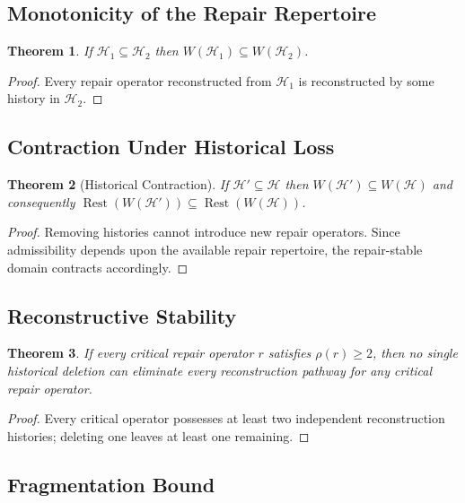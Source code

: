 \documentclass[12pt,oneside]{article}
\theoremstyle{plain}
\newtheorem{theorem}{Theorem}[section]
\theoremstyle{definition}
\theoremstyle{remark}
\theoremstyle{plain}
\DeclareMathOperator{\Rest}{Rest}
\begin{document}
\subsection{Monotonicity of the Repair Repertoire}

\begin{theorem}
If $\mathcal{H}_1 \subseteq \mathcal{H}_2$ then $W(\mathcal{H}_1) \subseteq W(\mathcal{H}_2)$.
\end{theorem}

\begin{proof}
Every repair operator reconstructed from $\mathcal{H}_1$ is reconstructed by some history in
$\mathcal{H}_2$.
\end{proof}

\subsection{Contraction Under Historical Loss}

\begin{theorem}[Historical Contraction]
If $\mathcal{H}' \subseteq \mathcal{H}$ then $W(\mathcal{H}') \subseteq W(\mathcal{H})$ and
consequently $\Rest(W(\mathcal{H}')) \subseteq \Rest(W(\mathcal{H}))$.
\end{theorem}

\begin{proof}
Removing histories cannot introduce new repair operators. Since admissibility depends upon the
available repair repertoire, the repair-stable domain contracts accordingly.
\end{proof}

\subsection{Reconstructive Stability}

\begin{theorem}
If every critical repair operator $r$ satisfies $\rho(r) \ge 2$, then no single historical
deletion can eliminate every reconstruction pathway for any critical repair operator.
\end{theorem}

\begin{proof}
Every critical operator possesses at least two independent reconstruction histories; deleting one
leaves at least one remaining.
\end{proof}

\subsection{Fragmentation Bound}
\end{document}
